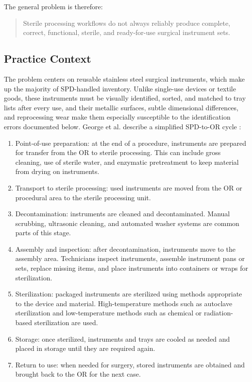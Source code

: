 \documentclass[10pt,a4paper]{article}
\begin{document}
The general problem is therefore:
\begin{quote}
Sterile processing workflows do not always reliably produce complete,
correct, functional, sterile, and ready-for-use surgical instrument sets.
\end{quote}
\subsection{Practice Context}
\label{sec:practice-context}

The problem centers on reusable stainless steel surgical instruments, which
make up the majority of SPD-handled inventory. Unlike single-use devices or
textile goods, these instruments must be visually identified, sorted, and
matched to tray lists after every use, and their metallic surfaces, subtle
dimensional differences, and reprocessing wear make them especially
susceptible to the identification errors documented below. George et al.
describe a simplified SPD-to-OR cycle
\cite{george-et-al-2024}:
\begin{enumerate}
  \item Point-of-use preparation: at the end of a procedure, instruments are prepared for transfer from the OR to sterile processing. This can include gross cleaning, use of sterile water, and enzymatic pretreatment to keep material from drying on instruments.
  \item Transport to sterile processing: used instruments are moved from the OR or procedural area to the sterile processing unit.
  \item Decontamination: instruments are cleaned and decontaminated. Manual scrubbing, ultrasonic cleaning, and automated washer systems are common parts of this stage.
  \item Assembly and inspection: after decontamination, instruments move to the assembly area. Technicians inspect instruments, assemble instrument pans or sets, replace missing items, and place instruments into containers or wraps for sterilization.
  \item Sterilization: packaged instruments are sterilized using methods appropriate to the device and material. High-temperature methods such as autoclave sterilization and low-temperature methods such as chemical or radiation-based sterilization are used.
  \item Storage: once sterilized, instruments and trays are cooled as needed and placed in storage until they are required again.
  \item Return to use: when needed for surgery, stored instruments are obtained and brought back to the OR for the next case.
\end{enumerate}
\end{document}
